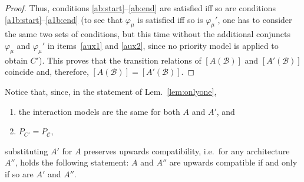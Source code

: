 \documentclass{llncs}
\newcommand{\lem}[1]{Lem.~\ref{lem:#1}}
\newcommand{\cB}{\ensuremath{\mathcal{B}}}
\newcommand{\cC}{\ensuremath{\mathcal{C}}}
\newcommand{\ndash}{--}
\newcommand{\ie}[1][\ ]{i.e.#1}
\newcommand{\semopen}[1]{\ensuremath{[{#1}]}}
\begin{document}
\begin{proof}
  Thus, conditions \ref{ab:start}\ndash\ref{ab:end} are satisfied iff
  so are conditions \ref{a1b:start}\ndash\ref{a1b:end} (to see that
  $\varphi_\mu$ is satisfied iff so is $\varphi_\mu'$, one has to
  consider the same two sets of conditions, but this time without the
  additional conjuncts $\varphi_\mu$ and $\varphi_\mu'$ in
  items~\ref{aux1} and \ref{aux2}, since no priority model is applied
  to obtain $C'$).  This proves that the transition relations of
  $\semopen{A(\cB)}$ and $\semopen{A'(\cB)}$ coincide and, therefore,
  $\semopen{A(\cB)} = \semopen{A'(\cB)}$.
\end{proof}

\begin{note}
  \label{rem:upwards:compat}
  Notice that, since, in the statement of \lem{onlyone}, 
  \begin{enumerate}
  \item the interaction models are the same for both $A$ and $A'$, and
  \item $P_{C'} = P_\cC$,
  \end{enumerate}
  substituting $A'$ for $A$ preserves upwards compatibility, \ie for any
  architecture $A''$, holds the following statement: $A$ and $A''$ are
  upwards compatible if and only if so are $A'$ and $A''$.
\end{note}
\end{document}
